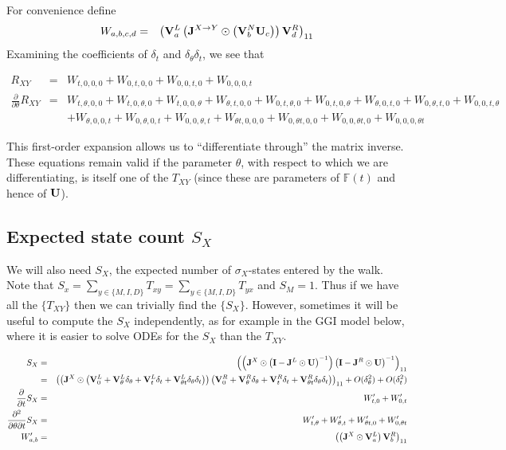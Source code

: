 \documentclass{article}
\begin{document}
For convenience define
\begin{eqnarray*}
W_{a,b,c,d} & = &
\left( {\bf V}^L_a \left( {\bf J}^{X \to Y} \odot \left( {\bf V}^N_b {\bf U}_c \right) \right) {\bf V}^R_d \right)_{11}
\end{eqnarray*}
Examining the coefficients of $\delta_t$ and $\delta_\theta \delta_t$, we see that

\begin{eqnarray*}
  R_{XY} & = &
  W_{t,0,0,0} + W_{0,t,0,0} + W_{0,0,t,0} + W_{0,0,0,t}
  \\
  \frac{\partial}{\partial \theta}R_{XY} & = &
  W_{t,\theta,0,0} + W_{t,0,\theta,0} + W_{t,0,0,\theta}
  + W_{\theta,t,0,0} + W_{0,t,\theta,0} + W_{0,t,0,\theta}
  + W_{\theta,0,t,0} + W_{0,\theta,t,0} + W_{0,0,t,\theta}
  \\ & &
  + W_{\theta,0,0,t} + W_{0,\theta,0,t} + W_{0,0,\theta,t}
  + W_{\theta t,0,0,0} + W_{0,\theta t,0,0} + W_{0,0,\theta t,0} + W_{0,0,0,\theta t}
\end{eqnarray*}

This first-order expansion allows us to ``differentiate through'' the matrix inverse.
These equations remain valid if the parameter $\theta$, with respect to which we are differentiating, is itself one of the $T_{XY}$
(since these are parameters of $\mathbb{F}(t)$ and hence of ${\bf U}$).

\subsection{Expected state count $S_X$}

We will also need $S_X$, the expected number of $\sigma_X$-states entered by the walk.
Note that $S_x = \sum_{y \in \{M,I,D\}} T_{xy}  = \sum_{y \in \{M,I,D\}} T_{yx}$
and $S_M = 1$.
Thus if we have all the $\{ T_{XY} \}$ then we can trivially find the $\{ S_X \}$.
However, sometimes it will be useful to compute the $S_X$ independently,
as for example in the GGI model below, where it is easier to solve ODEs for the $S_X$ than the $T_{XY}$.

\begin{eqnarray*}
S_X & = &
\left(
     \left(
          {\bf J}^X \odot
          \left( {\bf I} - {\bf J}^L \odot {\bf U} \right)^{-1}
     \right)
\left( {\bf I} - {\bf J}^R \odot {\bf U} \right)^{-1}
\right)_{11}
\\
& = &
\left(
     \left(
          {\bf J}^X \odot
          \left( {\bf V}_0^{L} + {\bf V}_\theta^{L} \delta_\theta + {\bf V}_t^{L} \delta_t + {\bf V}_{\theta t}^{L} \delta_\theta \delta_t \right)
     \right)
\left( {\bf V}_0^{R} + {\bf V}_\theta^{R} \delta_\theta + {\bf V}_t^{R} \delta_t + {\bf V}_{\theta t}^{R} \delta_\theta \delta_t \right)
\right)_{11}  + O(\delta_\theta^2) + O(\delta_t^2)
  \\
  \frac{\partial}{\partial t} S_X & = &
  W'_{t,0} + W'_{0,t}
  \\
  \frac{\partial^2}{\partial \theta \partial t} S_X & = &
  W'_{t,\theta} + W'_{\theta,t}
  + W'_{\theta t,0} + W'_{0,\theta t}
\\
W'_{a,b} & = &
\left( \left( {\bf J}^X \odot {\bf V}^L_a \right) {\bf V}^R_b \right)_{11}
\end{eqnarray*}
\end{document}
